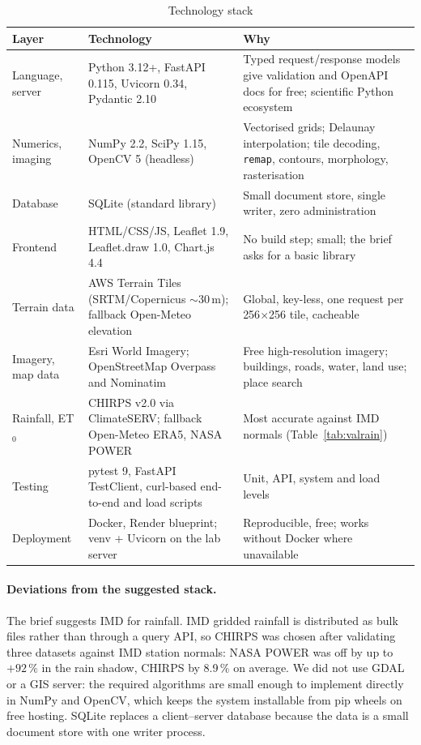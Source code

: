 \documentclass[manuscript,screen,review]{acmart}
\newcommand{\code}[1]{\texttt{\small #1}}
\begin{document}
\begin{table}[h]
  \caption{Technology stack}
  \label{tab:stack}
  \small
  \begin{tabularx}{\linewidth}{@{}P{2.6cm}P{4.4cm}Y@{}}
    \toprule
    Layer & Technology & Why \\
    \midrule
    Language, server & Python 3.12+, FastAPI 0.115, Uvicorn 0.34, Pydantic 2.10 & Typed request/response models give validation and OpenAPI docs for free; scientific Python ecosystem \\
    Numerics, imaging & NumPy 2.2, SciPy 1.15, OpenCV 5 (headless) & Vectorised grids; Delaunay interpolation; tile decoding, \code{remap}, contours, morphology, rasterisation \\
    Database & SQLite (standard library) & Small document store, single writer, zero administration \\
    Frontend & HTML/CSS/JS, Leaflet 1.9, Leaflet.draw 1.0, Chart.js 4.4 & No build step; small; the brief asks for a basic library \\
    Terrain data & AWS Terrain Tiles (SRTM/Copernicus $\sim$30\,m); fallback Open-Meteo elevation & Global, key-less, one request per 256$\times$256 tile, cacheable \\
    Imagery, map data & Esri World Imagery; OpenStreetMap Overpass and Nominatim & Free high-resolution imagery; buildings, roads, water, land use; place search \\
    Rainfall, ET$_0$ & CHIRPS v2.0 via ClimateSERV; fallback Open-Meteo ERA5, NASA POWER & Most accurate against IMD normals (Table~\ref{tab:valrain}) \\
    Testing & pytest 9, FastAPI TestClient, curl-based end-to-end and load scripts & Unit, API, system and load levels \\
    Deployment & Docker, Render blueprint; venv + Uvicorn on the lab server & Reproducible, free; works without Docker where unavailable \\
    \bottomrule
  \end{tabularx}
\end{table}

\paragraph{Deviations from the suggested stack.} The brief suggests IMD for rainfall. IMD
gridded rainfall is distributed as bulk files rather than through a query API, so CHIRPS was
chosen after validating three datasets against IMD station normals: NASA POWER was off by up to
$+92\,\%$ in the rain shadow, CHIRPS by 8.9\,\% on average. We did not use GDAL or a GIS
server: the required algorithms are small enough to implement directly in NumPy and OpenCV,
which keeps the system installable from pip wheels on free hosting. SQLite replaces a
client--server database because the data is a small document store with one writer process.
\end{document}
